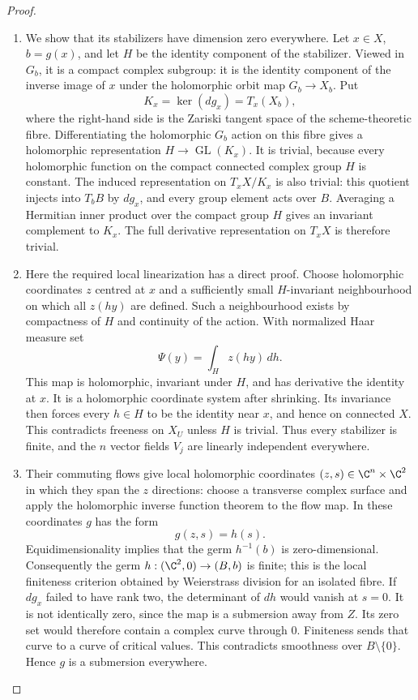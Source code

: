 \begin{proof}
\begin{enumerate}[label={$\langle1\rangle$\arabic*.},leftmargin=*]
\item We show that its stabilizers have dimension zero everywhere.
Let $x\in X$, $b=g(x)$, and let $H$ be the identity component
of the stabilizer.  Viewed in $G_b$, it is a compact complex
subgroup: it is the identity component of the inverse image
of $x$ under the holomorphic orbit map $G_b\to X_b$.
Put
\[
 K_x=\ker(dg_x)=T_x(X_b),
\]
where the right-hand side is the Zariski tangent space of
the scheme-theoretic fibre.  Differentiating the holomorphic
$G_b$ action on this fibre gives a holomorphic representation
$H\to\operatorname{GL}(K_x)$.  It is trivial, because every
holomorphic function on the compact connected complex group
$H$ is constant.  The induced representation on
$T_xX/K_x$ is also trivial: this quotient injects into
$T_bB$ by $dg_x$, and every group element acts over $B$.
Averaging a Hermitian inner product over the compact group
$H$ gives an invariant complement to $K_x$.  The full
derivative representation on $T_xX$ is therefore trivial.

\item Here the required local linearization has a direct proof.
Choose holomorphic coordinates $z$ centred at $x$ and a
sufficiently small $H$-invariant neighbourhood on which all
$z(hy)$ are defined.  Such a neighbourhood exists by
compactness of $H$ and continuity of the action.  With
normalized Haar measure set
\[
 \Psi(y)=\int_H z(hy)\,dh.
\]
This map is holomorphic, invariant under $H$, and has
derivative the identity at $x$.  It is a holomorphic
coordinate system after shrinking.  Its invariance then
forces every $h\in H$ to be the identity near $x$, and hence
on connected $X$.  This contradicts freeness on $X_U$ unless
$H$ is trivial.  Thus every stabilizer is finite, and the
$n$ vector fields $V_j$ are linearly independent everywhere.

\item Their commuting flows give local holomorphic coordinates
$(z,s)\in\C^n\times\C^2$ in which they span the $z$
directions: choose a transverse complex surface and apply
the holomorphic inverse function theorem to the flow map.
In these coordinates $g$ has the form
\[
 g(z,s)=h(s).
\]
Equidimensionality implies that the germ $h^{-1}(b)$ is
zero-dimensional.  Consequently the germ
$h:(\C^2,0)\to(B,b)$ is finite; this is the local finiteness
criterion obtained by Weierstrass division for an isolated
fibre.  If $dg_x$ failed to have rank two, the determinant
of $dh$ would vanish at $s=0$.  It is not identically zero,
since the map is a submersion away from $Z$.  Its zero set
would therefore contain a complex curve through $0$.
Finiteness sends that curve to a curve of critical values.
This contradicts smoothness over $B\setminus\{0\}$.
Hence $g$ is a submersion everywhere.


\end{enumerate}
\end{proof}
